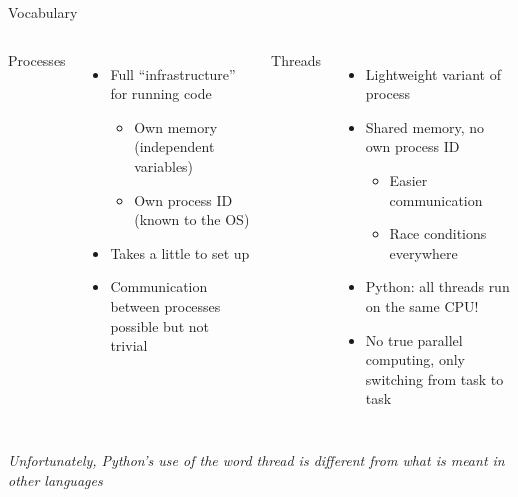 \begin{frame}{Vocabulary}
%
\begin{columns}[T]
Processes
\begin{itemize}
\item Full \enquote{infrastructure} for running code
	\begin{itemize}
	\item Own memory (\ie independent variables)
	\item Own process ID (\ie known to the OS)
	\end{itemize}
\item Takes a little to set up
\item Communication between processes possible but not trivial
\end{itemize}
%
Threads
\begin{itemize}
\item Lightweight variant of process
\item Shared memory, no own process ID
	\begin{itemize}
	\item Easier communication
	\item Race conditions everywhere
	\end{itemize}
\item Python: all threads run on the same CPU!
\item No true parallel computing, only switching from task to task
\end{itemize}
\end{columns}
%
\begin{center}
\emph{Unfortunately, Python's use of the word \emph{thread} is different from what is meant in other languages}
\end{center}
%
\end{frame}


